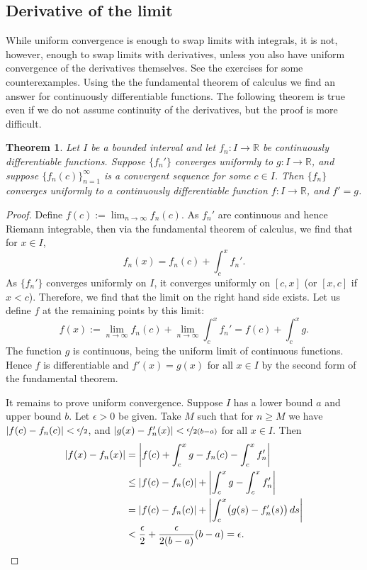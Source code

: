 \documentclass[12pt]{book}
\newcommand{\abs}[1]{\left\lvert {#1} \right\rvert}
\newcommand{\R}{{\mathbb{R}}}
\theoremstyle{plain}
\newtheorem{thm}{Theorem}[section]
\theoremstyle{remark}
\theoremstyle{definition}
\theoremstyle{exercise}
\theoremstyle{example}
\begin{document}
\subsection{Derivative of the limit}

While uniform convergence is enough to swap limits with integrals, it is not,
however, enough to swap limits with derivatives, unless you also have
uniform convergence of the derivatives themselves.
See the exercises for some counterexamples.  Using the 
the fundamental theorem of calculus we find an answer for continuously
differentiable functions.  The following theorem is true even if 
we do not assume continuity of the derivatives, but the proof is more
difficult.

\begin{thm} \label{thm:dersconverge}
Let $I$ be a bounded interval and let
$f_n \colon I \to \R$ be continuously differentiable functions.
Suppose $\{ f_n' \}$ converges uniformly to $g \colon I \to \R$,
and suppose $\{ f_n(c) \}_{n=1}^\infty$ is a
convergent sequence for some $c \in I$.  Then $\{ f_n \}$ converges uniformly to 
a continuously differentiable function $f \colon I \to \R$, and $f' = g$.
\end{thm}

\begin{proof}
Define $f(c) := \lim_{n\to \infty} f_n(c)$.
As $f_n'$ are continuous and hence Riemann integrable,
then
via the fundamental theorem of calculus, we find that for $x \in I$,
\begin{equation*}
f_n(x) = f_n(c) + \int_c^x f_n' .
\end{equation*}
As $\{ f_n' \}$ converges uniformly on $I$, it converges uniformly
on $[c,x]$ (or $[x,c]$ if $x < c$).
Therefore, we find that the limit on the right hand side exists.
Let us define $f$ at the remaining points by this limit:
\begin{equation*}
f(x) :=
\lim_{n\to\infty} f_n(c) + \lim_{n\to\infty} \int_c^x f_n'
=
f(c) + \int_c^x g .
\end{equation*}
The function $g$ is continuous, being the uniform limit of continuous
functions.  Hence $f$ is differentiable and $f'(x) = g(x)$ for all $x \in I$
by the second form of the fundamental theorem.

It remains to prove
uniform convergence.
Suppose $I$ has a lower bound $a$ and upper bound $b$.
Let $\epsilon > 0$ be given.  Take $M$
such that for $n \geq M$ we have
$\abs{f(c)-f_n(c)} < \nicefrac{\epsilon}{2}$,
and
$\abs{g(x)-f_n'(x)} < \nicefrac{\epsilon}{2(b-a)}$
for all $x \in I$.  Then
\begin{equation*}
\begin{split}
\abs{f(x) - f_n(x)} & =
\abs{f(c) + \int_c^x g - f_n(c) - \int_c^x f_n'}
\\
& \leq
\abs{f(c) - f_n(c)} + \abs{\int_c^x g - \int_c^x f_n'}
\\
& =
\abs{f(c) - f_n(c)} + \abs{\int_c^x \bigl(g(s) - f_n'(s)\bigr) \, ds}
\\
& <
\frac{\epsilon}{2}
+
\frac{\epsilon}{2(b-a)}
(b-a)
=\epsilon. \qedhere
\end{split}
\end{equation*}
\end{proof}
\end{document}
